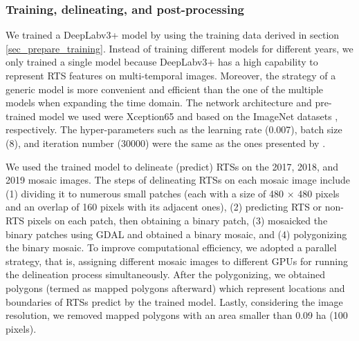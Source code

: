 \documentclass[authoryear,preprint,review,12pt]{elsarticle}
\begin{document}
\subsubsection{Training, delineating, and post-processing}
\label{sec_train_deli_post_pro}

We trained a DeepLabv3+ model by using the training data derived in section \ref{sec_prepare_training}. 
Instead of training different models for different years, we only trained a single model because DeepLabv3+ has a high capability to represent RTS features on multi-temporal images. 
Moreover, the strategy of a generic model is more convenient and efficient than the one of the multiple models when expanding the time domain. %
The network architecture and pre-trained model we used were Xception65 \citep{chollet2017xception} and based on the ImageNet datasets \citep{russakovsky2015imagenet}, respectively. 
The hyper-parameters such as the learning rate (0.007), batch size (8), and iteration number (30000) were the same as the ones presented by \cite{huang2020using}.


We used the trained model to delineate (predict) RTSs on the 2017, 2018, and 2019 mosaic images. 
The steps of delineating RTSs on each mosaic image include
(1) dividing it to numerous small patches (each with a size of 480 $\times$ 480 pixels and an overlap of 160 pixels with its adjacent ones),
(2) predicting RTS or non-RTS pixels on each patch, then obtaining a binary patch,
(3) mosaicked the binary patches using GDAL and obtained a binary mosaic, and %
(4) polygonizing the binary mosaic.  %
To improve computational efficiency, we adopted a parallel strategy, that is, assigning different mosaic images to different GPUs for running the delineation process simultaneously. 
After the polygonizing, we obtained polygons (termed as mapped polygons afterward) which represent locations and boundaries of RTSs predict by the trained model. 
Lastly, considering the image resolution, we removed mapped polygons with an area smaller than 0.09 ha (100 pixels). %
\end{document}
